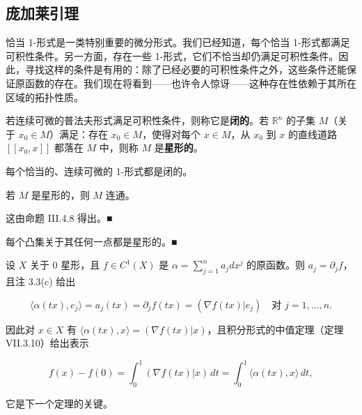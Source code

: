 \subsection*{庞加莱引理}

恰当 1-形式是一类特别重要的微分形式。我们已经知道，每个恰当 1-形式都满足可积性条件。另一方面，存在一些 1-形式，它们不恰当却仍满足可积性条件。因此，寻找这样的条件是有用的：除了已经必要的可积性条件之外，这些条件还能保证原函数的存在。我们现在将看到——也许令人惊讶——这种存在性依赖于其所在区域的拓扑性质。

若连续可微的普法夫形式满足可积性条件，则称它是\textbf{闭的}。若 $ \mathbb{R}^{n} $ 的子集 $ M $（关于 $ x_{0} \in M $）满足：存在 $ x_{0} \in M $，使得对每个 $ x \in M $，从 $ x_{0} $ 到 $ x $ 的直线道路 $ [[x_{0},x]] $ 都落在 $ M $ 中，则称 $ M $ 是\textbf{星形的}。


\begin{remark}

\begin{items}
\item

每个恰当的、连续可微的 1-形式都是闭的。

\item

若 $ M $ 是星形的，则 $ M $ 连通。

\proofhead
这由命题 III.4.8 得出。\nobreak\hspace{0.35em}■
\item

每个凸集关于其任何一点都是星形的。\nobreak\hspace{0.35em}■

\end{items}

设 $ X $ 关于 $ 0 $ 星形，且 $ f \in C^{1}(X) $ 是 $ \alpha = \sum_{j=1}^{n}a_{j}dx^{j} $ 的原函数。则 $ a_{j} = \partial_{j}f $，且注 3.3(c) 给出

\[
\langle\alpha(tx),e_{j}\rangle = a_{j}(tx) = \partial_{j}f(tx) = (\nabla f(tx)|e_{j}) \quad \text{对 } j = 1,\ldots,n .
\]

因此对 $ x \in X $ 有 $ \langle\alpha(tx),x\rangle = (\nabla f(tx)|x) $，且积分形式的中值定理（定理 VII.3.10）给出表示

\begin{equation}
f(x) - f(0) = \int_{0}^{1}(\nabla f(tx)|x)\,dt = \int_{0}^{1}\langle\alpha(tx),x\rangle\,dt ,\tag{3.3}
\end{equation}

它是下一个定理的关键。

\end{remark}

